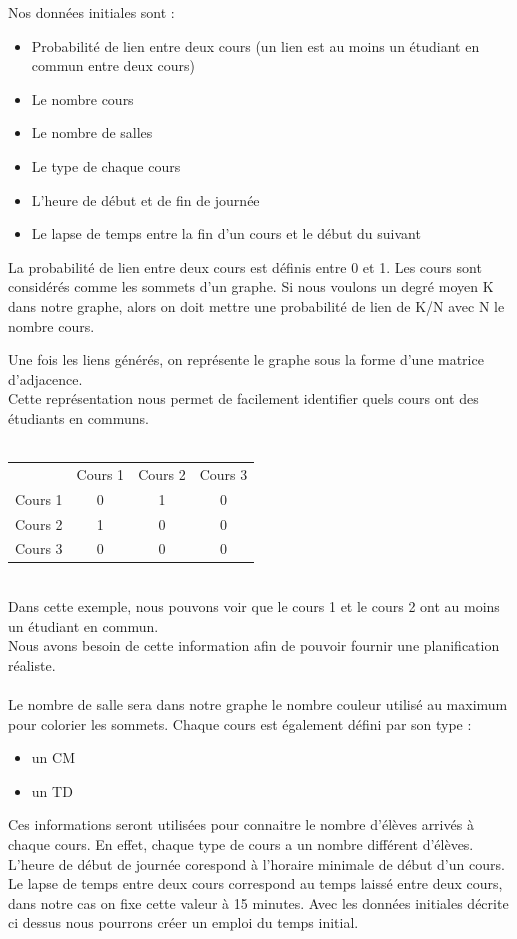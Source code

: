 \documentclass[a4paper,11pt]{article}
\begin{document}
	Nos données initiales sont :
	\begin{itemize}
		\item Probabilité de lien entre deux cours (un lien est au moins un étudiant en commun entre deux cours)
		\item Le nombre cours
		\item Le nombre de salles 
		\item Le type de chaque cours 
		\item L'heure de début et de fin de journée
		\item Le lapse de temps entre la fin d'un cours et le début du suivant
	\end{itemize}

	La probabilité de lien entre deux cours est définis entre 0 et 1. Les cours sont considérés comme les sommets d'un graphe. Si nous voulons un degré moyen K dans notre graphe, alors on doit mettre une probabilité de lien de K/N avec N le nombre cours.

	Une fois les liens générés, on représente le graphe sous la forme d'une matrice d'adjacence. \\
	Cette représentation nous permet de facilement identifier quels cours ont des étudiants en communs.\\
	\\
	\begin{tabular}{ | c | c | c | c |}
		\hline			
		\       & Cours 1 & Cours 2 & Cours 3\\
		Cours 1 &   0     &    1    &     0  \\
		Cours 2 &   1     &    0    &     0  \\
		Cours 3 &   0     &    0    &     0  \\
		\hline  
	\end{tabular}\\
	Dans cette exemple, nous pouvons voir que le cours 1 et le cours 2 ont au moins un étudiant en commun.\\
	Nous avons besoin de cette information afin de pouvoir fournir une planification réaliste.\\
	\\
	Le nombre de salle sera dans notre graphe le nombre couleur utilisé au maximum pour colorier les sommets.
	Chaque cours est également défini par son type :
	\begin{itemize}
		\item un CM
		\item  un TD
	\end{itemize}
	Ces informations seront utilisées pour connaitre le nombre d'élèves arrivés à chaque cours. En effet, chaque type de cours a un nombre différent d'élèves.\\
	L'heure de début de journée corespond à l'horaire minimale de début d'un cours.
	Le lapse de temps entre deux cours correspond au temps laissé entre deux cours, dans notre cas on fixe cette valeur à 15 minutes.
	Avec les données initiales décrite ci dessus nous pourrons créer un emploi du temps initial.
	
\end{document}
